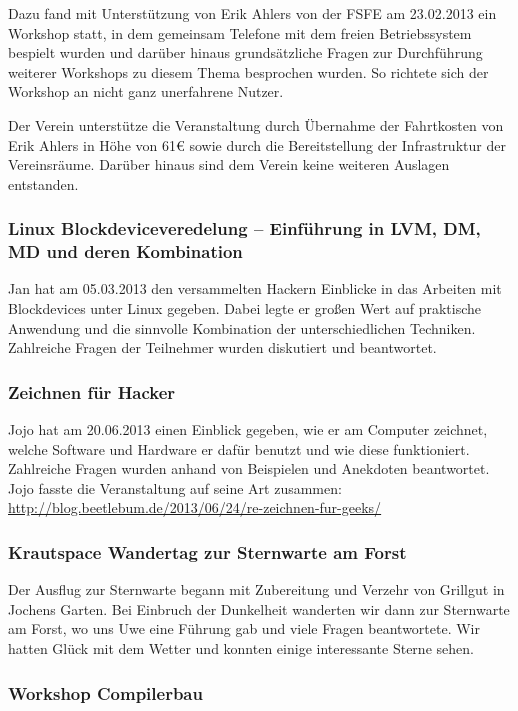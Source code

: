 \documentclass[10pt,DIV16]{scrartcl}
\begin{document}
Dazu fand mit Unterstützung von Erik Ahlers von der FSFE am 23.02.2013
ein Workshop statt, in dem gemeinsam Telefone mit dem freien
Betriebssystem bespielt wurden und darüber hinaus grundsätzliche
Fragen zur Durchführung weiterer Workshops zu diesem Thema
besprochen wurden. So richtete sich der Workshop an nicht ganz 
unerfahrene Nutzer.

Der Verein unterstütze die Veranstaltung durch Übernahme der
Fahrtkosten von Erik Ahlers in Höhe von 61\euro{} sowie durch die
Bereitstellung der Infrastruktur der Vereinsräume. Darüber hinaus
sind dem Verein keine weiteren Auslagen entstanden.

\subsubsection{Linux Blockdeviceveredelung -- Einführung in LVM, DM, MD und deren Kombination}

Jan hat am 05.03.2013 den versammelten Hackern Einblicke in das 
Arbeiten mit Blockdevices unter Linux gegeben. Dabei legte er großen 
Wert auf praktische Anwendung und die sinnvolle Kombination der 
unterschiedlichen Techniken. Zahlreiche Fragen der Teilnehmer wurden 
diskutiert und beantwortet. 

\subsubsection{Zeichnen für Hacker}

Jojo hat am 20.06.2013 einen Einblick gegeben, wie er am Computer 
zeichnet, welche Software und Hardware er dafür benutzt und wie diese 
funktioniert. Zahlreiche Fragen wurden anhand von Beispielen und 
Anekdoten beantwortet. Jojo fasste die Veranstaltung auf seine Art 
zusammen: 
\url{http://blog.beetlebum.de/2013/06/24/re-zeichnen-fur-geeks/}

\subsubsection{Krautspace Wandertag zur Sternwarte am Forst}

Der Ausflug zur Sternwarte begann mit Zubereitung und Verzehr von Grillgut in 
Jochens Garten. Bei Einbruch der Dunkelheit wanderten wir dann zur Sternwarte 
am Forst, wo uns Uwe eine Führung gab und viele Fragen beantwortete. Wir 
hatten Glück mit dem Wetter und konnten einige interessante Sterne sehen. 

\subsubsection{Workshop Compilerbau}
\end{document}
